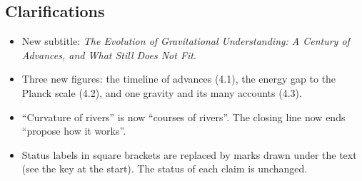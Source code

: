 \documentclass[11pt,a4paper]{article}
\begin{document}
\subsection*{Clarifications}
\begin{itemize}
  \item New subtitle: \emph{The Evolution of Gravitational Understanding: A Century of Advances, and What Still Does Not Fit}.
  \item Three new figures: the timeline of advances (4.1), the energy gap to the Planck scale (4.2), and one gravity and its many accounts (4.3).
  \item ``Curvature of rivers'' is now ``courses of rivers''. The closing line now ends ``propose how it works''.
  \item Status labels in square brackets are replaced by marks drawn under the text (see the key at the start). The status of each claim is unchanged.
\end{itemize}

\newpage


\end{document}
